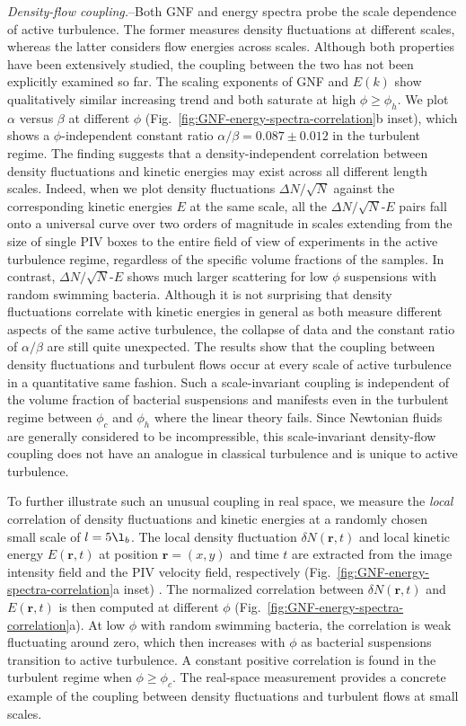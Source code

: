 \documentclass[twocolumn,aps,prl,amsmath,amssymb,longbibliography]{revtex4-2}
\begin{document}
\textit{Density-flow coupling.}--Both GNF and energy spectra probe the scale dependence of active turbulence. The former measures density fluctuations at different scales, whereas the latter considers flow energies across scales. Although both properties have been extensively studied, the coupling between the two has not been explicitly examined so far. The scaling exponents of GNF and $E(k)$ show qualitatively similar increasing trend and both saturate at high $\phi \geq \phi_h$. We plot $\alpha$ versus $\beta$ at different $\phi$ (Fig.~\ref{fig:GNF-energy-spectra-correlation}b inset), which shows a $\phi$-independent constant ratio $\alpha/\beta = 0.087 \pm 0.012$ in the turbulent regime. The finding suggests that a density-independent correlation between density fluctuations and kinetic energies may exist across all different length scales.
Indeed, when we plot density fluctuations $\Delta N/\sqrt N$ against the corresponding kinetic energies $E$ at the same scale, all the $\Delta N/\sqrt N$-$E$ pairs fall onto a universal curve over two orders of magnitude in scales extending from the size of single PIV boxes to the entire field of view of experiments in the active turbulence regime, regardless of the specific volume fractions of the samples. In contrast, $\Delta N/\sqrt N$-$E$ shows much larger scattering for low $\phi$ suspensions with random swimming bacteria. Although it is not surprising that density fluctuations correlate with kinetic energies in general as both measure different aspects of the same active turbulence, the collapse of data and the constant ratio of $\alpha/\beta$ are still quite unexpected. The results show that the coupling between density fluctuations and turbulent flows occur at every scale of active turbulence in a quantitative same fashion. Such a scale-invariant coupling is independent of the volume fraction of bacterial suspensions and manifests even in the turbulent regime between $\phi_c$ and $\phi_h$ where the linear theory fails. Since Newtonian fluids are generally considered to be incompressible, this scale-invariant density-flow coupling does not have an analogue in classical turbulence and is unique to active turbulence.

To further illustrate such an unusual coupling in real space, we measure the \emph{local} correlation of density fluctuations and kinetic energies at a randomly chosen small scale of $l = 5\l_b$. The local density fluctuation $\delta N(\mathbf{r},t)$ and local kinetic energy $E(\mathbf{r},t)$ at position $\mathbf{r} = (x,y)$ and time $t$ are extracted from the image intensity field and the PIV velocity field, respectively (Fig.~\ref{fig:GNF-energy-spectra-correlation}a inset) \cite{Liu2020}. The normalized correlation between $\delta N(\mathbf{r},t)$ and $E(\mathbf{r},t)$ is then computed at different $\phi$ (Fig.~\ref{fig:GNF-energy-spectra-correlation}a). At low $\phi$ with random swimming bacteria, the correlation is weak fluctuating around zero, which then increases with $\phi$ as bacterial suspensions transition to active turbulence. A constant positive correlation is found in the turbulent regime when $\phi \geq \phi_c$. The real-space measurement provides a concrete example of the coupling between density fluctuations and turbulent flows at small scales.
\end{document}
